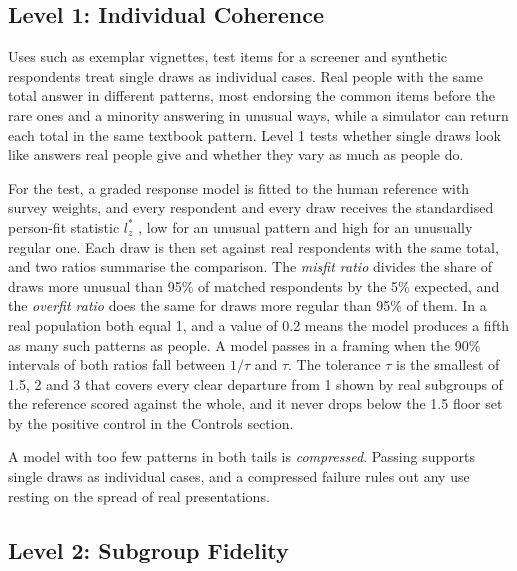 \subsection{Level 1: Individual Coherence}
\label{sec:l1-method}

Uses such as exemplar vignettes, test items for a screener and synthetic respondents treat single draws as individual cases.
Real people with the same total answer in different patterns, most endorsing the common items before the rare ones and a minority answering in unusual ways, while a simulator can return each total in the same textbook pattern.
Level 1 tests whether single draws look like answers real people give and whether they vary as much as people do.

For the test, a graded response model \citep{samejima1969graded} is fitted to the human reference with survey weights, and every respondent and every draw receives the standardised person-fit statistic $l_z^*$ \citep{drasgow1985appropriateness,snijders2001personfit,sinharay2016personfit}, low for an unusual pattern and high for an unusually regular one.
Each draw is then set against real respondents with the same total, and two ratios summarise the comparison.
The \emph{misfit ratio} divides the share of draws more unusual than 95\% of matched respondents by the 5\% expected, and the \emph{overfit ratio} does the same for draws more regular than 95\% of them.
In a real population both equal 1, and a value of 0.2 means the model produces a fifth as many such patterns as people.
A model passes in a framing when the 90\% intervals of both ratios fall between $1/\tau$ and $\tau$.
The tolerance $\tau$ is the smallest of 1.5, 2 and 3 that covers every clear departure from 1 shown by real subgroups of the reference scored against the whole, and it never drops below the 1.5 floor set by the positive control in the Controls section.

A model with too few patterns in both tails is \emph{compressed}.
Passing supports single draws as individual cases, and a compressed failure rules out any use resting on the spread of real presentations.

\subsection{Level 2: Subgroup Fidelity}
\label{sec:l2-method}

